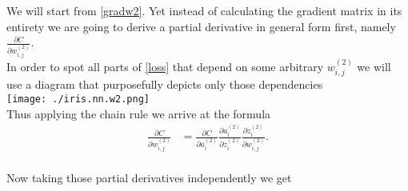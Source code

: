 \documentclass[12pt,titlepage]{article}
\begin{document}
\newpage
We will start from \eqref{gradw2}. Yet instead of calculating the gradient matrix in its entirety we are going to derive a partial derivative in general form first, namely $\frac{\partial C}{\partial w_{i,j}^{(2)}}$.\\ 
In order to spot all parts of \eqref{loss} that depend on some arbitrary $w_{i,j}^{(2)}$ we will use a diagram that purposefully depicts only those dependencies\\
\texttt{[image: ./iris.nn.w2.png]}\\
Thus applying the chain rule we arrive at the formula\\
\begin{equation} \label{chain2}
\begin{split}
\frac{\partial C}{\partial w_{i,j}^{(2)}}&=\frac{\partial C}{\partial a_{i}^{(2)}}\frac{\partial a_{i}^{(2)}}{\partial z_{i}^{(2)}}\frac{\partial z_{i}^{(2)}}{\partial w_{i,j}^{(2)}}.
\end{split}
\end{equation}
\\
Now taking those partial derivatives independently we get
\end{document}
